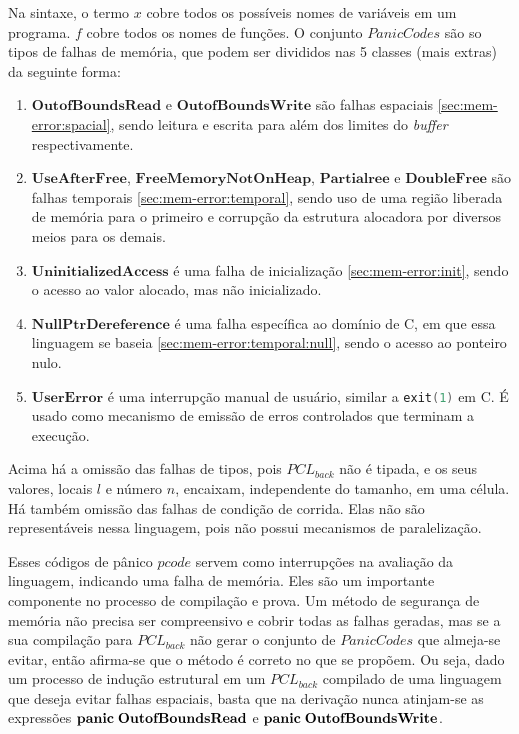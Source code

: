 \noindent Na sintaxe, o termo $x$ cobre todos os possíveis nomes de variáveis em um programa. 
$f$ cobre todos os nomes de funções. O conjunto $PanicCodes$ são so tipos de falhas de memória, que podem ser divididos nas 5 classes (mais extras) da seguinte forma:
\begin{enumerate}
	\item $\mathbf{OutofBoundsRead}$ e $\mathbf{OutofBoundsWrite}$ são falhas espaciais \ref{sec:mem-error:spacial}, sendo leitura e escrita para além dos limites do \emph{buffer} respectivamente.
	\item $\mathbf{UseAfterFree}$, $\mathbf{FreeMemoryNotOnHeap}$, $\mathbf{Partial ree}$ e $\mathbf{Double Free}$ são falhas temporais \ref{sec:mem-error:temporal}, sendo uso de uma região liberada de memória para o primeiro e corrupção da estrutura alocadora por diversos meios para os demais.
	\item $\mathbf{UninitializedAccess}$ é uma falha de inicialização \ref{sec:mem-error:init}, sendo o acesso ao valor alocado, mas não inicializado. 
	\item $\mathbf{NullPtrDereference}$ é uma falha específica ao domínio de C, em que essa linguagem se baseia \ref{sec:mem-error:temporal:null}, sendo o acesso ao ponteiro nulo.
	\item $\mathbf{UserError}$ é uma interrupção manual de usuário, similar a \lstinline[language=C]|exit(1)| em C. É usado como mecanismo de emissão de erros controlados que terminam a execução.
\end{enumerate}

\noindent Acima há a omissão das falhas de tipos, pois $PCL_{back}$ não é tipada, e os seus valores, locais $l$ e número $n$, encaixam, independente do tamanho, em uma célula. Há também omissão das falhas de condição de corrida. Elas não são representáveis nessa linguagem, pois não possui mecanismos de paralelização.

Esses códigos de pânico $pcode$ servem como interrupções na avaliação da linguagem, indicando uma falha de memória. Eles são um importante componente no processo de compilação e prova. Um método de segurança de memória não precisa ser compreensivo e cobrir todas as falhas geradas, mas se a sua compilação para $PCL_{back}$ não gerar o conjunto de $PanicCodes$ que almeja-se evitar, então afirma-se que o método é correto no que se propõem. Ou seja, dado um processo de indução estrutural em um $PCL_{back}$ compilado de uma linguagem que deseja evitar falhas espaciais, basta que na derivação nunca atinjam-se as expressões $\mathbf{panic}\;\mathbf{OutofBoundsRead}$ e $\mathbf{panic}\;\mathbf{OutofBoundsWrite}$.

